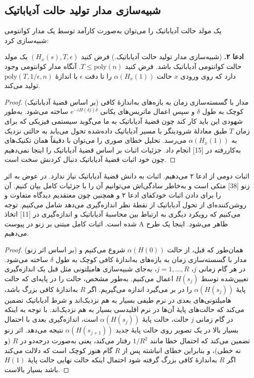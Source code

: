 \subsection{ شبیه‌سازی مدار تولید حالت آدیاباتیک}
یک مولد حالت آدیاباتیک را می‌توان به‌صورت کارآمد توسط یک مدار کوانتومی شبیه‌سازی کرد:

\textbf{ادعا ۲.} (شبیه‌سازی مدار تولید حالت آدیاباتیک.) فرض کنید $(H_x(s), T, \epsilon)$ یک مولد حالت کوانتومی آدیاباتیک باشد. فرض کنید $T \le \mathrm{poly}(n)$. آنگاه مدار کوانتومی وجود دارد که روی ورودی $x$ حالت $\alpha(H_x(1))$ را تا دقت $\epsilon$ با اندازهٔ $\mathrm{poly}(T, 1/\epsilon, n)$ تولید می‌کند.
\begin{proof}
	(بر اساس قضیهٔ آدیاباتیک) مدار با گسسته‌سازی زمان به بازه‌های به‌اندازهٔ کافی کوچک به طول $\delta$ و سپس اعمال ماتریس‌های یکانی $e^{-iH(\delta j)\delta}$ ساخته می‌شود. به‌طور شهودی این باید کار کند چون قضیهٔ آدیاباتیک به ما می‌گوید سیستمی فیزیکی که برای زمان $T$ طبق معادلهٔ شرودینگر با مسیر آدیاباتیک داده‌شده تحول می‌یابد به حالتی نزدیک به $\alpha(H_x(1))$ می‌رسد. تحلیل خطای صوری را می‌توان با دقیقاً همان تکنیک‌های به‌کاررفته در [15] انجام داد. جزئیات اثبات بر اساس قضیهٔ آدیاباتیک را اینجا نمی‌دهیم چون خود اثبات قضیهٔ آدیاباتیک دنبال کردنش سخت است.
\end{proof}	
	اثبات دومی از ادعا ۲ می‌دهیم. اثبات به دانش قضیهٔ آدیاباتیک نیاز ندارد. در عوض به اثر زنو [38] متکی است و به‌خاطر سادگی‌اش می‌توانیم آن را با جزئیات کامل بیان کنیم. آن را برای دادن اثبات خودکفای ادعا ۲ و همچنین چون معتقدیم دیدگاه متفاوت و روشن‌کننده‌ای از تحول آدیاباتیک از نقطهٔ نظر اندازه‌گیری می‌دهد شامل می‌کنیم. توجه می‌کنیم که رویکرد دیگری به ارتباط بین محاسبهٔ آدیاباتیک و اندازه‌گیری در [11] اتخاذ شده است. اثبات کامل مبتنی بر زنو در پیوست A ظاهر می‌شود. اینجا یک طرح می‌دهیم.

\begin{proof}
 (بر اساس اثر زنو) همان‌طور که قبل، از حالت $\alpha(H(0))$ شروع می‌کنیم و مدار با گسسته‌سازی زمان به بازه‌های به‌اندازهٔ کافی کوچک به طول $\delta$ ساخته می‌شود. در هر گام زمانی $j$، $j = 1, \ldots, R$، به‌جای شبیه‌سازی هامیلتونی مثل قبل یک اندازه‌گیری تعیین‌شده توسط $H(s_j)$ اعمال می‌کنیم. به‌طور مشخص، حالت را در پایه‌ای که حالت پایهٔ $\alpha(H(s_j))$ را در بر می‌گیرد اندازه می‌گیریم. اگر $R$ به‌اندازهٔ کافی بزرگ باشد، هامیلتونی‌های بعدی در نرم طیفی بسیار به هم نزدیک‌اند و شرط آدیاباتیک تضمین می‌کند که حالت‌های پایهٔ آن‌ها در نرم اقلیدسی بسیار به هم نزدیک‌اند. با توجه به اینکه در گام زمانی $j$ حالت، حالت پایهٔ $\alpha(H(s_j))$ است، اندازه‌گیری بعدی با احتمال بسیار بالا در یک تصویر روی حالت پایهٔ جدید $\alpha(H(s_{j+1}))$ نتیجه می‌دهد. اثر زنو تضمین می‌کند که احتمال خطا مانند $1/R^2$ رفتار می‌کند، یعنی به‌صورت درجه‌دو در $R$ (و نه خطی)، و بنابراین خطای انباشته پس از $R$ گام هنوز کوچک است که دلالت می‌کند اگر $R$ به‌اندازهٔ کافی بزرگ گرفته شود احتمال اینکه حالت نهایی حالت پایهٔ $H(1)$ باشد بسیار بالاست.	
\end{proof}

